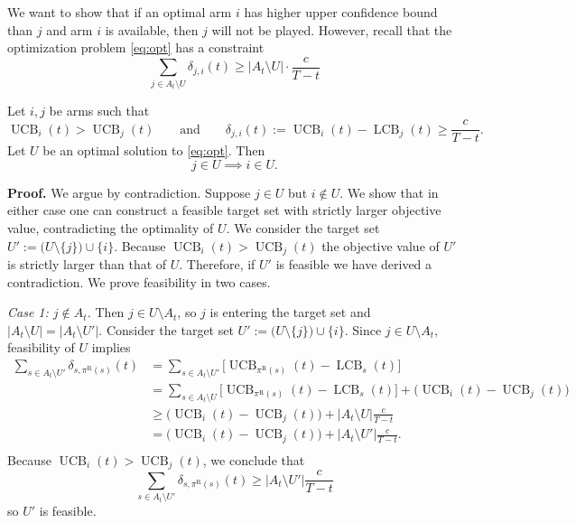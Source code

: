 \documentclass[opre,blindrev]{informs3}
\newcommand{\UCB}{\operatorname{UCB}}
\newcommand{\LCB}{\operatorname{LCB}}
\begin{document}
\begin{APPENDICES}
We want to show that if an optimal arm \(i\) has higher upper confidence bound than \(j\) and arm \(i\) is available, then \(j\) will not be played. However, recall that the optimization problem \eqref{eq:opt} has a constraint 
\[\sum_{j\in A_t\setminus U}\delta_{j,i}(t)\geq |A_t\setminus U|\cdot \frac{c}{T-t}\]


\begin{lemma}
\label{lem:monotonicity-selection}
    Let \(i,j\) be arms such that
    \[
    \UCB_i(t)>\UCB_j(t)
    \qquad\text{and}\qquad
    \delta_{j,i}(t):=\UCB_i(t)-\LCB_j(t)\ge \frac{c}{T-t}.
    \]
    Let \(U\) be an optimal solution to \eqref{eq:opt}. Then
    \[
    j\in U \implies  i\in U.
    \]
\end{lemma}

\noindent\textbf{Proof.}
    We argue by contradiction. Suppose \(j\in U\) but \(i\notin U\). We show that in either case one can construct a feasible target set with strictly larger objective value, contradicting the optimality of \(U\). We consider the target set \(U' := \bigl(U\setminus\{j\}\bigr)\cup\{i\}\). Because \(\UCB_i(t)>\UCB_j(t)\) the objective value of \(U'\) is strictly larger than that of \(U\). Therefore, if \(U'\) is feasible we have derived a contradiction. We prove feasibility in two cases.
    
    \textit{Case 1: \(j\notin A_t\).}
    Then \(j\in U\setminus A_t\), so \(j\) is entering the target set and \(|A_t\setminus U|=|A_t\setminus U'|\). Consider the target set \( U' := \bigl(U\setminus\{j\}\bigr)\cup\{i\}. \)
    Since \(j\in U\setminus A_t\), feasibility of \(U\) implies
    \begin{align*}
        \sum_{s\in A_t\setminus U'} \delta_{s,\pi^{\mathrm R}(s)}(t)&=\sum_{s\in A_t\setminus U'}\bigg[\UCB_{\pi^{\mathrm R}(s)}(t)-\LCB_s(t)\bigg]\\
        &=\sum_{s\in A_t\setminus U}\bigg[\UCB_{\pi^{\mathrm R}(s)}(t)-\LCB_s(t)\bigg]+ \bigg(\UCB_i(t)-\UCB_j(t)\bigg)\\
        &\ge \bigg(\UCB_i(t)-\UCB_j(t)\bigg)+|A_t\setminus U|\frac{c}{T-t}\\
        &=\bigg(\UCB_i(t)-\UCB_j(t)\bigg)+|A_t\setminus U'|\frac{c}{T-t}.\\
    \end{align*}
    Because \(\UCB_i(t)>\UCB_j(t)\), we conclude that 
    \[\sum_{s\in A_t\setminus U'} \delta_{s,\pi^{\mathrm R}(s)}(t)\ge |A_t\setminus U'|\frac{c}{T-t}\]
    so \(U'\) is feasible. 
    

\end{APPENDICES}
\end{document}
